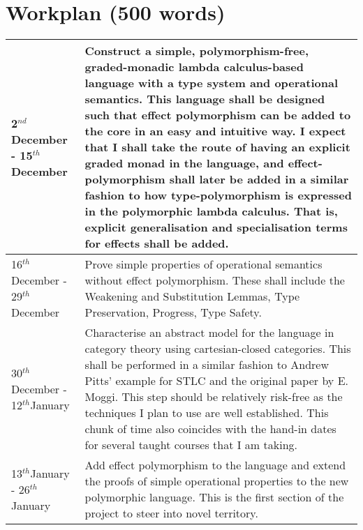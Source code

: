 \documentclass[11pt]{article}
\renewcommand{\th}{$^{th}$}
\newcommand{\nd}{$^{nd}$}
\begin{document}
\section{Workplan (500 words)}

\begin{tabular}{|p{6cm}||p{10cm}|}
\hline
	2\nd December - 15\th December & Construct a simple, polymorphism-free, graded-monadic lambda calculus-based language with a type system and operational semantics. This language shall be designed such that effect polymorphism can be added to the core in an easy and intuitive way. I expect that I shall take the route of having an explicit graded monad in the language, and effect-polymorphism shall later be added in a similar fashion to how type-polymorphism is expressed in the polymorphic lambda calculus. That is, explicit generalisation and specialisation terms for effects shall be added. \\\hline
	16\th December - 29\th December & Prove simple properties of operational semantics without effect polymorphism. These shall include the Weakening and Substitution Lemmas, Type Preservation, Progress, Type Safety.\\\hline
	30\th December - 12\th January & Characterise an abstract model for the language in category theory using cartesian-closed categories. This shall be performed in a similar fashion to Andrew Pitts' example for STLC and the original paper by E. Moggi. This step should be relatively risk-free as the techniques I plan to use are well established. This chunk of time also coincides with the hand-in dates for several taught courses that I am taking.  \\\hline
	13\th January - 26\th January &  Add effect polymorphism to the language and extend the proofs of simple operational properties to the new polymorphic language. This is the first section of the project to steer into novel territory. \\\hline
	

\end{tabular}
\end{document}
